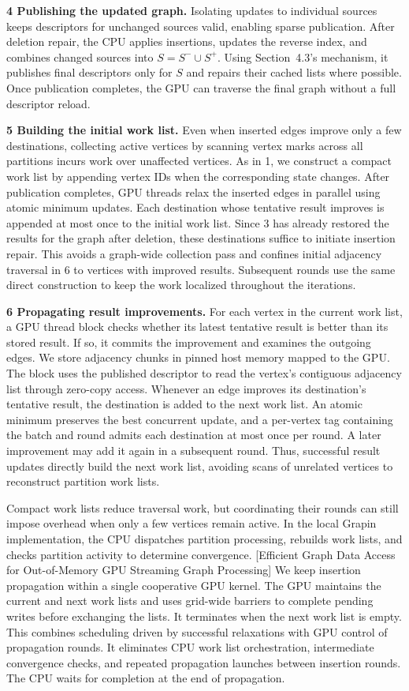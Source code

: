 \textbf{4 Publishing the updated graph.} Isolating updates to individual sources keeps descriptors for unchanged sources valid, enabling sparse publication. After deletion repair, the CPU applies insertions, updates the reverse index, and combines changed sources into $S=S^-\cup S^+$. Using Section~4.3's mechanism, it publishes final descriptors only for $S$ and repairs their cached lists where possible. Once publication completes, the GPU can traverse the final graph without a full descriptor reload.

\textbf{5 Building the initial work list.} Even when inserted edges improve only a few destinations, collecting active vertices by scanning vertex marks across all partitions incurs work over unaffected vertices. As in 1, we construct a compact work list by appending vertex IDs when the corresponding state changes. After publication completes, GPU threads relax the inserted edges in parallel using atomic minimum updates. Each destination whose tentative result improves is appended at most once to the initial work list. Since 3 has already restored the results for the graph after deletion, these destinations suffice to initiate insertion repair. This avoids a graph-wide collection pass and confines initial adjacency traversal in 6 to vertices with improved results. Subsequent rounds use the same direct construction to keep the work localized throughout the iterations.

\textbf{6 Propagating result improvements.} For each vertex in the current work list, a GPU thread block checks whether its latest tentative result is better than its stored result. If so, it commits the improvement and examines the outgoing edges. We store adjacency chunks in pinned host memory mapped to the GPU. The block uses the published descriptor to read the vertex's contiguous adjacency list through zero-copy access. Whenever an edge improves its destination's tentative result, the destination is added to the next work list. An atomic minimum preserves the best concurrent update, and a per-vertex tag containing the batch and round admits each destination at most once per round. A later improvement may add it again in a subsequent round. Thus, successful result updates directly build the next work list, avoiding scans of unrelated vertices to reconstruct partition work lists.

Compact work lists reduce traversal work, but coordinating their rounds can still impose overhead when only a few vertices remain active. In the local Grapin implementation, the CPU dispatches partition processing, rebuilds work lists, and checks partition activity to determine convergence. [Efficient Graph Data Access for Out-of-Memory GPU Streaming Graph Processing] We keep insertion propagation within a single cooperative GPU kernel. The GPU maintains the current and next work lists and uses grid-wide barriers to complete pending writes before exchanging the lists. It terminates when the next work list is empty. This combines scheduling driven by successful relaxations with GPU control of propagation rounds. It eliminates CPU work list orchestration, intermediate convergence checks, and repeated propagation launches between insertion rounds. The CPU waits for completion at the end of propagation.

